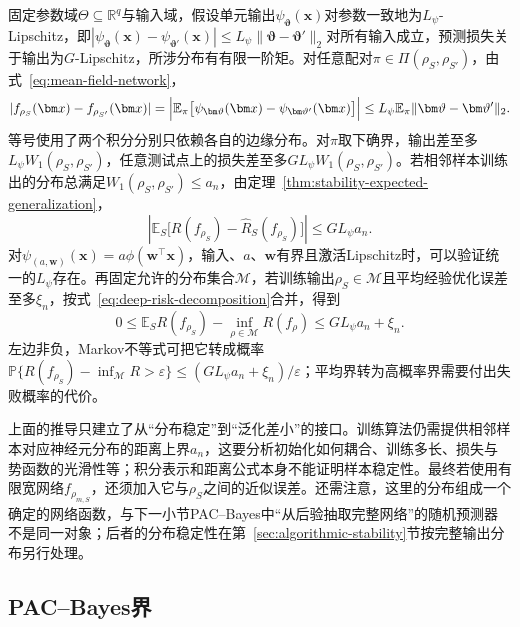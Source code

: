 固定参数域$\Theta\subseteq\mathbb R^q$与输入域，假设单元输出$\psi_{\bm\vartheta}(\bm x)$对参数一致地为$L_\psi$-Lipschitz，即$|\psi_{\bm\vartheta}(\bm x)-\psi_{\bm\vartheta'}(\bm x)|\leq L_\psi\|\bm\vartheta-\bm\vartheta'\|_2$对所有输入成立，预测损失关于输出为$G$-Lipschitz，所涉分布有有限一阶矩。对任意配对$\pi\in\Pi(\rho_S,\rho_{S'})$，由式~\eqref{eq:mean-field-network}，
\[
 |f_{\rho_S}(\bm x)-f_{\rho_{S'}}(\bm x)|
 =\Bigl|\mathbb E_\pi\bigl[\psi_{\bm\vartheta}(\bm x)-\psi_{\bm\vartheta'}(\bm x)\bigr]\Bigr|
 \leq L_\psi\mathbb E_\pi\|\bm\vartheta-\bm\vartheta'\|_2.
\]
等号使用了两个积分分别只依赖各自的边缘分布。对$\pi$取下确界，输出差至多$L_\psi W_1(\rho_S,\rho_{S'})$，任意测试点上的损失差至多$GL_\psi W_1(\rho_S,\rho_{S'})$。若相邻样本训练出的分布总满足$W_1(\rho_S,\rho_{S'})\leq a_n$，由定理~\ref{thm:stability-expected-generalization}，
\[
 \left|\mathbb E_S\bigl[R(f_{\rho_S})-\hat R_S(f_{\rho_S})\bigr]\right|
 \leq GL_\psi a_n.
\]
对$\psi_{(a,\bm w)}(\bm x)=a\phi(\bm w^\top\bm x)$，输入、$a$、$\bm w$有界且激活Lipschitz时，可以验证统一的$L_\psi$存在。再固定允许的分布集合$\mathcal M$，若训练输出$\rho_S\in\mathcal M$且平均经验优化误差至多$\xi_n$，按式~\eqref{eq:deep-risk-decomposition}合并，得到
\begin{equation}
 0\leq
 \mathbb E_S R(f_{\rho_S})
 -\inf_{\rho\in\mathcal M}R(f_\rho)
 \leq G L_\psi a_n+\xi_n.
 \label{eq:mean-field-excess-risk}
\end{equation}
左边非负，Markov不等式可把它转成概率$\mathbb P\{R(f_{\rho_S})-\inf_{\mathcal M}R>\varepsilon\}\leq(GL_\psi a_n+\xi_n)/\varepsilon$；平均界转为高概率界需要付出失败概率的代价。

上面的推导只建立了从“分布稳定”到“泛化差小”的接口。训练算法仍需提供相邻样本对应神经元分布的距离上界$a_n$，这要分析初始化如何耦合、训练多长、损失与势函数的光滑性等；积分表示和距离公式本身不能证明样本稳定性。最终若使用有限宽网络$f_{\rho_{m,S}}$，还须加入它与$\rho_S$之间的近似误差。还需注意，这里的分布组成一个确定的网络函数，与下一小节PAC--Bayes中“从后验抽取完整网络”的随机预测器不是同一对象；后者的分布稳定性在第~\ref{sec:algorithmic-stability}节按完整输出分布另行处理。

\subsection{PAC--Bayes界}
\label{sec:network-pac-bayes}

